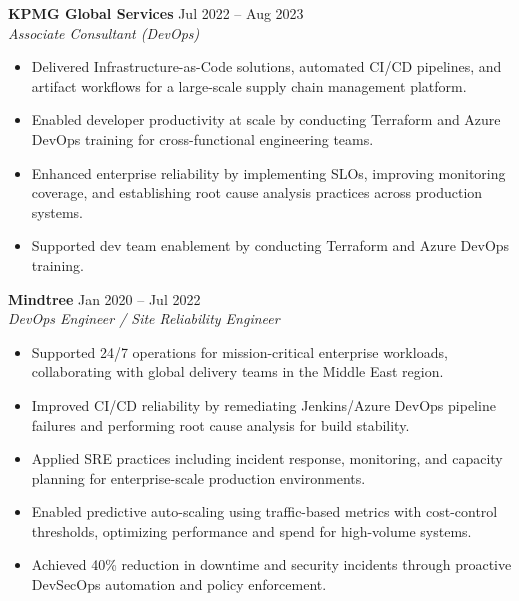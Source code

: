 \documentclass[a4paper,10pt]{article}
\begin{document}
\textbf{KPMG Global Services} \hfill Jul 2022 -- Aug 2023 \\
\emph{Associate Consultant (DevOps)}  
\begin{itemize}[leftmargin=*]
 \item {Delivered Infrastructure-as-Code solutions, automated CI/CD pipelines, and artifact workflows for a large-scale supply chain management platform.}
    \item {Enabled developer productivity at scale by conducting Terraform and Azure DevOps training for cross-functional engineering teams.}
    \item {Enhanced enterprise reliability by implementing SLOs, improving monitoring coverage, and establishing root cause analysis practices across production systems.}
      \item Supported dev team enablement by conducting Terraform and Azure DevOps training.

      \newpage

\end{itemize}
\textbf{Mindtree} \hfill Jan 2020 -- Jul 2022 \\
\emph{DevOps Engineer / Site Reliability Engineer}  
\begin{itemize}[leftmargin=*]
 \item {Supported 24/7 operations for mission-critical enterprise workloads, collaborating with global delivery teams in the Middle East region.}
    \item {Improved CI/CD reliability by remediating Jenkins/Azure DevOps pipeline failures and performing root cause analysis for build stability.}
    \item {Applied SRE practices including incident response, monitoring, and capacity planning for enterprise-scale production environments.}
    \item {Enabled predictive auto-scaling using traffic-based metrics with cost-control thresholds, optimizing performance and spend for high-volume systems.}
    \item {Achieved 40\% reduction in downtime and security incidents through proactive DevSecOps automation and policy enforcement.}

\end{itemize}
\end{document}
